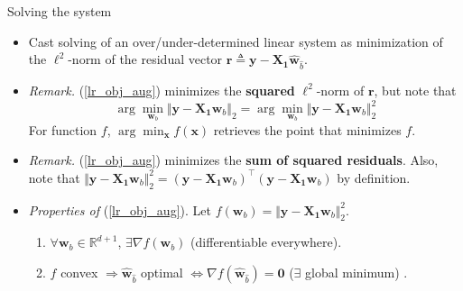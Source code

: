 \documentclass{beamer}
\numberwithin{equation}{section}
\newcommand{\aref}[1]{\alert{\ref{#1}}}
\begin{document}
\begin{frame}{Solving the system}
    \begin{itemize}
        \item
        Cast solving of an over/under-determined linear system as minimization
        of the $ \ell^2 $-norm of the residual vector $ \mathbf{r} \triangleq
        \mathbf{y} - \mathbf{X}_\mathbf{1}\hat{\mathbf{w}}_{\hat{b}} $.

        \item
        \textit{Remark.} (\aref{lr_obj_aug}) minimizes the \textbf{squared}
        $ \ell^2 $-norm of $ \mathbf{r} $, but note that
        \begin{equation*}
            \arg\min_{\mathbf{w}_b}
            \Vert\mathbf{y} - \mathbf{X}_\mathbf{1}\mathbf{w}_b\Vert_2 =
            \arg\min_{\mathbf{w}_b}
            \Vert\mathbf{y} - \mathbf{X}_\mathbf{1}\mathbf{w}_b\Vert_2^2
        \end{equation*}
        For function $ f $, $ \arg\min_\mathbf{x}f(\mathbf{x}) $ retrieves
        the point that minimizes $ f $.

        \item
        \textit{Remark.} (\aref{lr_obj_aug}) minimizes the
        \textbf{sum of squared residuals}. Also, note that
        $ \Vert\mathbf{y} - \mathbf{X}_\mathbf{1}\mathbf{w}_b\Vert_2^2 =
        (\mathbf{y} - \mathbf{X}_\mathbf{1}\mathbf{w}_b)^\top(\mathbf{y} -
        \mathbf{X}_\mathbf{1}\mathbf{w}_b) $ by definition.

        \item
        \textit{Properties of }(\aref{lr_obj_aug}). Let $ f(\mathbf{w}_b) =
        \Vert\mathbf{y} - \mathbf{X}_\mathbf{1}\mathbf{w}_b\Vert_2^2 $.
        \begin{enumerate}
            \item
            $ \forall \mathbf{w}_b \in \mathbb{R}^{d + 1} $,
            $ \exists \nabla f(\mathbf{w}_b) $ (differentiable everywhere).

            \item
            $ f $ convex $ \Rightarrow \hat{\mathbf{w}}_{\hat{b}} $ optimal
            $ \Leftrightarrow \nabla f(\hat{\mathbf{w}}_{\hat{b}}) =
            \mathbf{0} $ ($ \exists $ global minimum) \cite{bv_convex_opt}.
        \end{enumerate}
    \end{itemize}
\end{frame}
\end{document}
